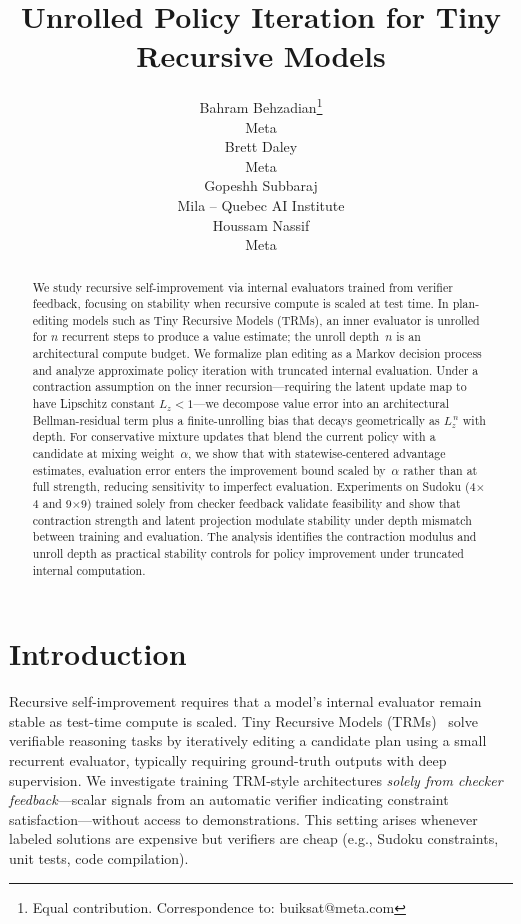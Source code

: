 \documentclass{article}
\title{Unrolled Policy Iteration for Tiny Recursive Models}
\author{Bahram Behzadian\thanks{Equal contribution. Correspondence to: buiksat@meta.com} \\
Meta \\
\And
Brett Daley\footnotemark[1] \\
Meta \\
\And
Gopeshh Subbaraj \\
Mila -- Quebec AI Institute \\
\And
Houssam Nassif \\
Meta
}
\theoremstyle{plain}
\theoremstyle{definition}
\theoremstyle{remark}
\begin{document}

\maketitle
\begin{abstract}
We study recursive self-improvement via internal evaluators trained from verifier feedback, focusing on stability when recursive compute is scaled at test time.
In plan-editing models such as Tiny Recursive Models (TRMs), an inner evaluator is unrolled for $n$ recurrent steps to produce a value estimate; the unroll depth~$n$ is an architectural compute budget.
We formalize plan editing as a Markov decision process and analyze approximate policy iteration with truncated internal evaluation.
Under a contraction assumption on the inner recursion---requiring the latent update map to have Lipschitz constant $L_z < 1$---we decompose value error into an architectural Bellman-residual term plus a finite-unrolling bias that decays geometrically as $L_z^{\,n}$ with depth.
For conservative mixture updates that blend the current policy with a candidate at mixing weight~$\alpha$, we show that with statewise-centered advantage estimates, evaluation error enters the improvement bound scaled by~$\alpha$ rather than at full strength, reducing sensitivity to imperfect evaluation.
Experiments on Sudoku (4${\times}$4 and 9${\times}$9) trained solely from checker feedback validate feasibility and show that contraction strength and latent projection modulate stability under depth mismatch between training and evaluation.
The analysis identifies the contraction modulus and unroll depth as practical stability controls for policy improvement under truncated internal computation.
\end{abstract}

\section{Introduction}
\label{sec:intro}

Recursive self-improvement requires that a model's internal evaluator remain stable as test-time compute is scaled.
Tiny Recursive Models (TRMs)~\citep{TRM2025} solve verifiable reasoning tasks by iteratively editing a candidate plan using a small recurrent evaluator, typically requiring ground-truth outputs with deep supervision.
We investigate training TRM-style architectures \emph{solely from checker feedback}---scalar signals from an automatic verifier indicating constraint satisfaction---without access to demonstrations.
This setting arises whenever labeled solutions are expensive but verifiers are cheap (e.g., Sudoku constraints, unit tests, code compilation).
\end{document}
